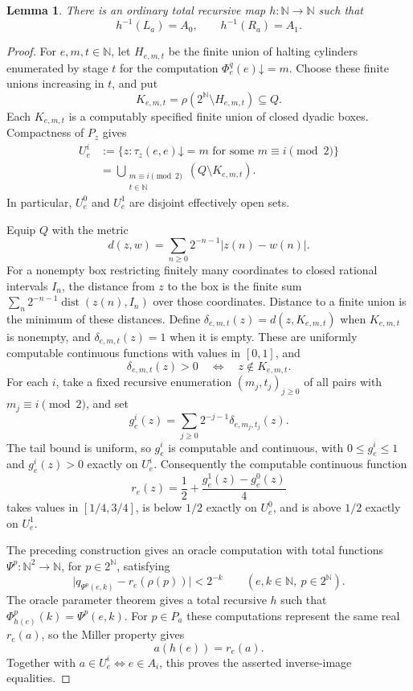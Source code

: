 \documentclass[11pt]{article}
\newtheorem{lemma}[theorem]{Lemma}
\newcommand{\N}{\mathbb N}
\begin{document}
\begin{lemma}\label{lem:miller-cut-reduction}
There is an ordinary total recursive map $h:\N\to\N$ such that
\[
 h^{-1}(L_a)=A_0,\qquad h^{-1}(R_a)=A_1.
\]
\end{lemma}
\begin{proof}
For $e,m,t\in\N$, let $H_{e,m,t}$ be the finite union of halting
cylinders enumerated by stage $t$ for the computation
$\Phi_e^q(e)\mathord\downarrow=m$. Choose these finite unions increasing
in $t$, and put
\[
 K_{e,m,t}=\rho(2^{\N}\setminus H_{e,m,t})\subseteq Q.
\]
Each $K_{e,m,t}$ is a computably specified finite union of closed dyadic
boxes. Compactness of $P_z$ gives
\begin{align*}
 U_e^i
 &:=\{z:\tau_z(e,e)\mathord\downarrow=m
                      \text{ for some }m\equiv i\pmod2\}\\
 &=\bigcup_{\substack{m\equiv i\pmod2\\t\in\N}}
       (Q\setminus K_{e,m,t}).
\end{align*}
In particular, $U_e^0$ and $U_e^1$ are disjoint effectively open sets.

Equip $Q$ with the metric
\[
 d(z,w)=\sum_{n\geq0}2^{-n-1}|z(n)-w(n)|.
\]
For a nonempty box restricting finitely many coordinates to closed
rational intervals $I_n$, the distance from $z$ to the box is the
finite sum
$\sum_n2^{-n-1}\operatorname{dist}(z(n),I_n)$ over those coordinates.
Distance to a finite union is the minimum of these distances. Define
$\delta_{e,m,t}(z)=d(z,K_{e,m,t})$ when $K_{e,m,t}$ is nonempty, and
$\delta_{e,m,t}(z)=1$ when it is empty. These are uniformly computable
continuous functions with values in $[0,1]$, and
\[
 \delta_{e,m,t}(z)>0\quad\Longleftrightarrow\quad
 z\notin K_{e,m,t}.
\]
For each $i$, take a fixed recursive enumeration
$(m_j,t_j)_{j\geq0}$ of all pairs with $m_j\equiv i\pmod2$, and set
\[
 g_e^i(z)=\sum_{j\geq0}2^{-j-1}\delta_{e,m_j,t_j}(z).
\]
The tail bound is uniform, so $g_e^i$ is computable and continuous,
with $0\leq g_e^i\leq1$ and $g_e^i(z)>0$ exactly on $U_e^i$.
Consequently the computable continuous function
\[
 r_e(z)=\frac12+\frac{g_e^1(z)-g_e^0(z)}4
\]
takes values in $[1/4,3/4]$, is below $1/2$ exactly on $U_e^0$, and
is above $1/2$ exactly on $U_e^1$.

The preceding construction gives an oracle computation with total
functions $\Psi^p:\N^2\to\N$, for $p\in2^{\N}$, satisfying
\[
 \bigl|q_{\Psi^p(e,k)}-r_e(\rho(p))\bigr|<2^{-k}
 \qquad(e,k\in\N,\ p\in2^{\N}).
\]
The oracle parameter theorem gives a total recursive $h$ such that
$\Phi_{h(e)}^p(k)=\Psi^p(e,k)$. For $p\in P_a$ these computations
represent the same real $r_e(a)$, so the Miller property gives
\[
 a(h(e))=r_e(a).
\]
Together with $a\in U_e^i\Longleftrightarrow e\in A_i$, this proves
the asserted inverse-image equalities.
\end{proof}
\end{document}
